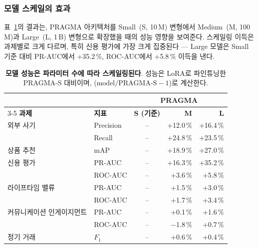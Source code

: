 \subsubsection{모델 스케일의 효과}
\label{sec:scale_effect_result}
표~\ref{tab:scale_results}의 결과는, PRAGMA 아키텍처를 Small~(S, 10\,M) 변형에서 Medium~(M, 100\,M)과 Large~(L, 1\,B) 변형으로 확장했을 때의 성능 영향을 보여준다.
스케일링 이득은 과제별로 크게 다르며, 특히 신용 평가에 가장 크게 집중된다 — Large 모델은 Small 기준 대비 PR-AUC에서 +35.2\,\%, ROC-AUC에서 +5.8\,\% 이득을 낸다.

\begin{table}[t]
\centering
\begin{tabular}{llcrr}
& & \multicolumn{3}{c}{\textbf{PRAGMA}} \\
\cmidrule(lr){3-5}
\textbf{과제}             & \textbf{지표} & \textbf{S (기준)} & \textbf{M} & \textbf{L} \\
\midrule
외부 사기            & Precision       & --               &  +12.0\,\%             & +16.4\,\%             \\
                          & Recall          & --               &  +24.8\,\%             &  +23.5\,\%             \\
\addlinespace
상품 추천    & mAP             & --               &  +18.9\,\%             &  +27.0\,\%             \\
\addlinespace
신용 평가            & PR-AUC          & --               & +16.3\,\%             & +35.2\,\%             \\
                          & ROC-AUC         & --               &  +3.6\,\%             &  +5.8\,\%             \\
\addlinespace
라이프타임 밸류            & PR-AUC          & --               &  +1.5\,\%             &  +3.0\,\%             \\
                          & ROC-AUC         & --               &  +1.7\,\%             &  +3.4\,\%             \\
\addlinespace
커뮤니케이션 인게이지먼트  & PR-AUC          & --               & +0.1\,\%             & +1.6\,\%             \\
                          & ROC-AUC         & --               & $-$1.8\,\%             &  +0.7\,\%             \\
\addlinespace
정기 거래    & $F_\text{1}$    & --               &  +0.6\,\%             &  +0.4\,\%             \\
\end{tabular}
\caption{\textbf{모델 성능은 파라미터 수에 따라 스케일링된다}.
성능은 LoRA로 파인튜닝한 PRAGMA-S 대비이며, ($\text{model} / \text{PRAGMA-S} - 1$)로 계산한다.
}
\label{tab:scale_results}
\end{table}


